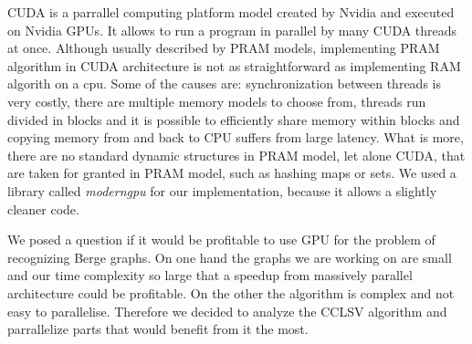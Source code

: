CUDA is a parrallel computing platform model created by Nvidia and executed on Nvidia GPUs. It allows to run a program in parallel by many CUDA threads at once. Although usually described by PRAM models, implementing PRAM algorithm in CUDA architecture is not as straightforward as implementing RAM algorith on a cpu. Some of the causes are: synchronization between threads is very costly, there are multiple memory models to choose from, threads run divided in blocks and it is possible to efficiently share memory within blocks and copying memory from and back to CPU suffers from large latency. What is more, there are no standard dynamic structures in PRAM model, let alone CUDA, that are taken for granted in PRAM model, such as hashing maps or sets. We used a library called \emph{moderngpu} for our implementation, because it allows a slightly cleaner code.


We posed a question if it would be profitable to use GPU for the problem of recognizing Berge graphs. On one hand the graphs we are working on are small and our time complexity so large that a speedup from massively parallel architecture could be profitable. On the other the algorithm is complex and not easy to parallelise. Therefore we decided to analyze the  CCLSV algorithm and parrallelize parts that would benefit from it the most.





